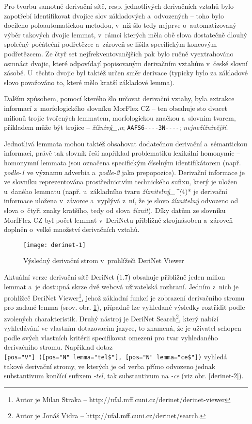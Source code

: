 Pro tvorbu samotné derivační sítě, resp. jednotlivých derivačních vztahů
bylo zapotřebí identifikovat dvojice slov základových a~odvozených --
toho bylo docíleno poloautomatickou metodou, v~níž šlo tedy nejprve
o~automatizovaný výběr takových dvojic lemmat, v~rámci kterých měla obě
slova dostatečně dlouhý společný počáteční podřetězec a~zároveň se
lišila specifickým koncovým podřetězcem. Ze čtyř set
nejfrekventovanějších pak bylo ručně vyextrahováno osmnáct dvojic, které
odpovídají popisovaným derivačním vztahům v~české slovní zásobě.
U~těchto dvojic byl taktéž určen směr derivace (typicky bylo za základové
slovo považováno to, které mělo kratší základové lemma).
\parencite{derinet-cz}

Dalším způsobem, pomocí kterého šlo určovat derivační vztahy, byla
extrakce informací z~morfologického slovníku MorFlex CZ -- ten obsahuje
sto dvacet milionů trojic tvořených lemmatem, morfologickou značkou
a~slovním tvarem, příkladem může být trojice ‒ \emph{žížnivý\_,n};
\texttt{AAFS6-\/-\/-\/-3N-\/-\/-\/-}; \emph{nejnežížnivější}.
\parencite{morflex}

Jednotlivá lemmata mohou taktéž obsahovat dodatečnou derivační
a~sémantickou informaci, právě tak slovník řeší například problematiku
lexikální homonymie -- homonymní lemmata jsou označena specifickým
číselným identifikátorem (např. \emph{podle-1} ve významu adverbia
a~\emph{podle-2} jako prepopozice). Derivační informace je ve slovníku
reprezentována prostřednictvím technického sufixu, který je uložen
u~daného lemmatu (např. u~základního tvaru \emph{žíznitelný\_\^{}(}4)* je
derivační informace uložena v~závorce a~vyplývá z~ní, že je slovo
\emph{žíznitelný} odvozeno od slova o~čtyři znaky kratšího, tedy od
slova \emph{žíznit}). Díky datům ze slovníku MorfFlex CZ byl počet
lemmat v~DeriNetu přibližně ztrojnásoben a~zároveň doplněn o~velké
množství derivačních vztahů.~\parencite{sevcikova16}

\begin{figure}[ht]   
    \centering
    \texttt{[image: derinet-1]}  
    \caption{Výsledný derivační strom v~prohlížeči DeriNet Viewer~\parencite{derinet}}
    \label{derinet-1}
 \end{figure}

Aktuální verze derivační sítě DeriNet (1.7) obsahuje přibližně jeden
milion lemmat a~je dostupná skrze dvě webová uživatelská rozhraní.
Jedním z~nich je prohlížeč DeriNet
Viewer\footnote{Autor je Milan Straka -- http://ufal.mff.cuni.cz/derinet/derinet-viewer},
jehož základní funkcí je zobrazení derivačního stromu pro zadané lemma
(srov. obr. \ref{derinet-1}), případně lze vyhledané výsledky roztřídit
podle zvolených charakteristik. Druhý nástroj je DeriNet
Search\footnote{Autor je Jonáš Vidra -- http://ufal.mff.cuni.cz/derinet/search.},
který nabízí vyhledávání ve vlastním dotazovacím jazyce, to znamená, že
je uživatel schopen podle svých vlastních kritérii specifikovat omezení
pro tvar vyhledaného derivačního stromu. Například dotaz
\texttt{{[}pos="V"{]}\ ({[}pos="N"\ lemma="tel\$"{]},\ {[}pos="N"\ lemma="ce\$"{]})}
vyhledá takové derivační stromy, ve kterých je od verba přímo odvozeno
jednak substantivum končící sufixem \emph{-tel}, tak substantivum na
\emph{-ce} (viz obr. \ref{derinet-2}).~\parencite{derinet-cz}

